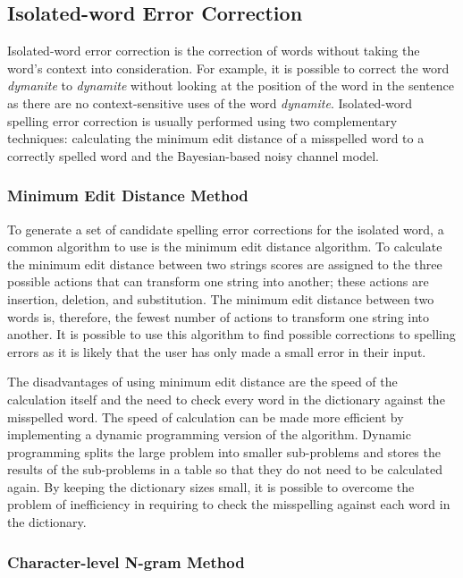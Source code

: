 \subsection{Isolated-word Error Correction}

Isolated-word error correction is the correction of words without taking the word's context into consideration. For example, it is possible to correct the word \emph{dymanite} to \emph{dynamite} without looking at the position of the word in the sentence as there are no context-sensitive uses of the word \emph{dynamite}. Isolated-word spelling error correction is usually performed using two complementary techniques: calculating the minimum edit distance of a misspelled word to a correctly spelled word and the Bayesian-based noisy channel model.

\subsubsection{Minimum Edit Distance Method}

To generate a set of candidate spelling error corrections for the isolated word, a common algorithm to use is the minimum edit distance algorithm. To calculate the minimum edit distance between two strings scores are assigned to the three possible actions that can transform one string into another; these actions are insertion, deletion, and substitution. The minimum edit distance between two words is, therefore, the fewest number of actions to transform one string into another. It is possible to use this algorithm to find possible corrections to spelling errors as it is likely that the user has only made a small error in their input.

The disadvantages of using minimum edit distance are the speed of the calculation itself and the need to check every word in the dictionary against the misspelled word. The speed of calculation can be made more efficient by implementing a dynamic programming version of the algorithm. Dynamic programming splits the large problem into smaller sub-problems and stores the results of the sub-problems in a table so that they do not need to be calculated again. By keeping the dictionary sizes small, it is possible to overcome the problem of inefficiency in requiring to check the misspelling against each word in the dictionary.

\subsubsection{Character-level N-gram Method}

